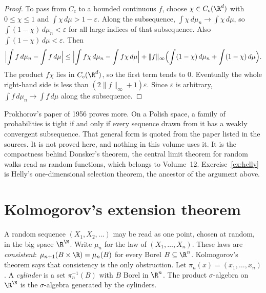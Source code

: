 \begin{proof}
To pass from $C_c$ to a bounded continuous $f$, choose $\chi\in C_c(\R^d)$ with $0\le\chi\le 1$ and $\int\chi\,d\mu>1-\varepsilon$. Along the
subsequence, $\int\chi\,d\mu_n\to\int\chi\,d\mu$, so $\int(1-\chi)\,d\mu_n<\varepsilon$ for all large indices of that subsequence. Also
$\int(1-\chi)\,d\mu<\varepsilon$. Then
\[\Bigl|\int f\,d\mu_n-\int f\,d\mu\Bigr|\le\Bigl|\int f\chi\,d\mu_n-\int f\chi\,d\mu\Bigr|+\|f\|_\infty\Bigl(\int(1-\chi)\,d\mu_n+\int(1-\chi)\,d\mu\Bigr).\]
The product $f\chi$ lies in $C_c(\R^d)$, so the first term tends to $0$. Eventually the whole right-hand side is less than
$(2\|f\|_\infty+1)\varepsilon$. Since $\varepsilon$ is arbitrary, $\int f\,d\mu_n\to\int f\,d\mu$ along the subsequence.
\end{proof}

Prokhorov's paper of 1956 proves more. On a Polish space, a family of probabilities is tight if and only if every sequence drawn from it has
a weakly convergent subsequence. That general form is quoted from the paper listed in the sources. It is not proved here, and nothing in this
volume uses it. It is the compactness behind Donsker's theorem, the central limit theorem for random walks read as random functions, which
belongs to Volume~12. Exercise~\ref{ex:helly} is Helly's one-dimensional selection theorem, the ancestor of the argument above.

\section{Kolmogorov's extension theorem}

A random sequence $(X_1,X_2,\ldots)$ may be read as one point, chosen at random, in the big space $\R^\N$. Write $\mu_n$ for the law of $(X_1,\ldots,X_n)$. These laws are
\emph{consistent}: $\mu_{n+1}(B\times\R)=\mu_n(B)$ for every Borel $B\subseteq\R^n$. Kolmogorov's theorem says that consistency is the only
obstruction. Let $\pi_n(x)=(x_1,\ldots,x_n)$. A \emph{cylinder} is a set $\pi_n^{-1}(B)$ with $B$ Borel in $\R^n$. The product $\sigma$-algebra
on $\R^\N$ is the $\sigma$-algebra generated by the cylinders.

